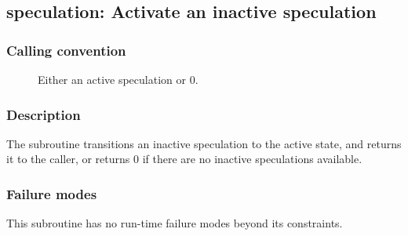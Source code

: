 \clearpage
{}
{}
\label{subr:speculation}
\subsection*{speculation: Activate an inactive speculation}

\subsubsection*{Calling convention}

\begin{description}
\item[] Either an active speculation or 0.
\end{description}

\subsubsection*{Description}

The  subroutine transitions an inactive
speculation to the active state, and returns it to the caller, or
returns 0 if there are no inactive speculations available.

\subsubsection*{Failure modes}

This subroutine has no run-time failure modes beyond its constraints.
